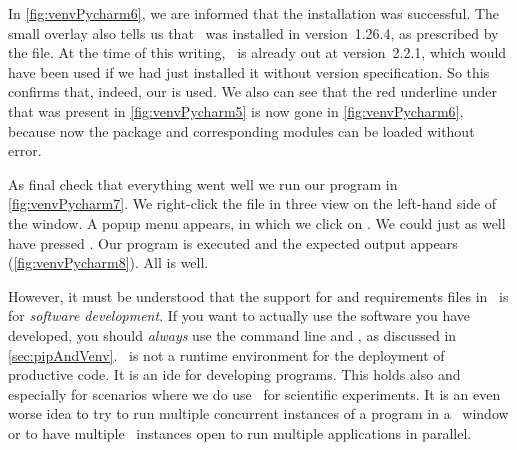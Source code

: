 In \cref{fig:venvPycharm6}, we are informed that the installation was successful.
The small overlay also tells us that \numpy\ was installed in version~1.26.4, as prescribed by the  file.
At the time of this writing, \numpy\ is already out at version~2.2.1, which would have been used if we had just installed it without version specification.
So this confirms that, indeed, our  is used.
We also can see that the red underline under  that was present in \cref{fig:venvPycharm5} is now gone in \cref{fig:venvPycharm6}, because now the package and corresponding modules can be loaded without error.

As final check that everything went well we run our program  in \cref{fig:venvPycharm7}.
We right-click the file in three view on the left-hand side of the window.
A popup menu appears, in which we click on .
We could just as well have pressed .
Our program is executed and the expected output appears (\cref{fig:venvPycharm8}).
All is well.

However, it must be understood that the support for  and requirements files in \pycharm\ is for \emph{software development}.
If you want to actually use the software you have developed, you should \emph{always} use the command line and , as discussed in \cref{sec:pipAndVenv}.
\pycharm\ is not a runtime environment for the deployment of productive code.
It is an \acrfull{ide} for developing programs.%
%
%
%
This holds also and especially for scenarios where we do use \python\ for scientific experiments.
It is an even worse idea to try to run multiple concurrent instances of a program in a \pycharm\ window or to have multiple \pycharm\ instances open to run multiple applications in parallel.%
%
\FloatBarrier%
\endhsection%
%
